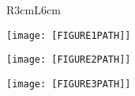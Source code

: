 \documentclass{article}
\begin{document}
\begin{figure}
    \begin{minipage}[c]{.45\linewidth}
      \centering
        \begin{tabular}{R{3cm}L{6cm}}
          \bottomrule
        \end{tabular}
           
    \end{minipage}\hfill
    \begin{minipage}[c]{.45\linewidth}
        \centering
        \texttt{[image: [FIGURE1PATH]]}  

    \end{minipage}
\end{figure}




\begin{figure}[!h]
    \centering
    \texttt{[image: [FIGURE2PATH]]}
\end{figure}


\begin{figure}[!h]
    \centering 
    \texttt{[image: [FIGURE3PATH]]}
\end{figure}
\end{document}
